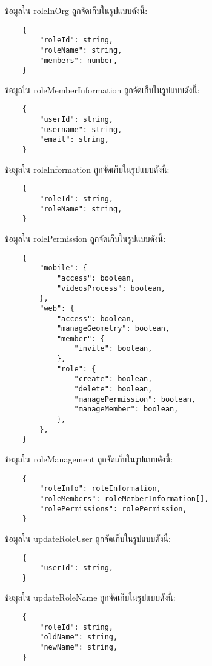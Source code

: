 \clearpage

ข้อมูลใน roleInOrg ถูกจัดเก็บในรูปแบบดังนี้:
\begin{lstlisting}
    {
        "roleId": string,
        "roleName": string,
        "members": number,
    }
\end{lstlisting}

ข้อมูลใน roleMemberInformation ถูกจัดเก็บในรูปแบบดังนี้:
\begin{lstlisting}
    {
        "userId": string,
        "username": string,
        "email": string,
    }
\end{lstlisting}

ข้อมูลใน roleInformation ถูกจัดเก็บในรูปแบบดังนี้:
\begin{lstlisting}
    {
        "roleId": string,
        "roleName": string,
    }
\end{lstlisting}

ข้อมูลใน rolePermission ถูกจัดเก็บในรูปแบบดังนี้:
\begin{lstlisting}
    {
        "mobile": {
            "access": boolean,
            "videosProcess": boolean,
        },
        "web": {
            "access": boolean,
            "manageGeometry": boolean,
            "member": {
                "invite": boolean,
            },
            "role": {
                "create": boolean,
                "delete": boolean,
                "managePermission": boolean,
                "manageMember": boolean,
            },
        },
    }
\end{lstlisting}

\clearpage

ข้อมูลใน roleManagement ถูกจัดเก็บในรูปแบบดังนี้:
\begin{lstlisting}
    {
        "roleInfo": roleInformation,
        "roleMembers": roleMemberInformation[],
        "rolePermissions": rolePermission,
    }
\end{lstlisting}

ข้อมูลใน updateRoleUser ถูกจัดเก็บในรูปแบบดังนี้:
\begin{lstlisting}
    {
        "userId": string,
    }
\end{lstlisting}

ข้อมูลใน updateRoleName ถูกจัดเก็บในรูปแบบดังนี้:
\begin{lstlisting}
    {
        "roleId": string,
        "oldName": string,
        "newName": string,
    }
\end{lstlisting}
\fi